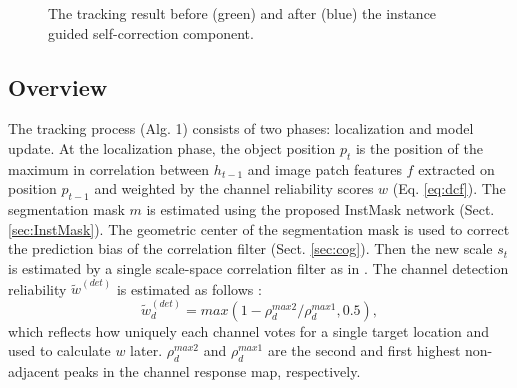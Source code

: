 \documentclass[review]{elsarticle}
\begin{document}
\begin{figure}
                       \hspace{-0.6em}
    \caption{The tracking result before (green) and after (blue) the instance guided self-correction component.}
    \label{fig:IGSC}
\end{figure}

\subsection{Overview}

The tracking process (Alg. 1) consists of two phases: localization and model update. 
At the localization phase,  the object position $p_t$ is the position of the maximum in correlation between $h_{t-1}$ and image patch features $f$ extracted on position $p_{t-1}$ and weighted by the channel reliability scores $w$ (Eq. \ref{eq:dcf}).
The segmentation mask $m$ is estimated using the proposed InstMask network (Sect. \ref{sec:InstMask}).
The geometric center of the segmentation mask is used to correct the prediction bias of the correlation filter (Sect. \ref{sec:cog}).
Then the new scale $s_t$ is estimated by a single scale-space correlation filter as in \cite{Danelljan2014AccurateSE}.
The channel detection reliability $\tilde{w}^{(det)}$ is estimated as follows \cite{Lukezic2017DiscriminativeCF}:
\begin{equation} \label{eq:det}
\tilde w_d^{(det)} = max(1 - \rho_d^{max2} / \rho_d^{max1}, 0.5),
\end{equation}
which reflects how uniquely each channel votes for a single target location and used to calculate $w$ later. $\rho_d^{max2}$ and $\rho_d^{max1}$ are the second and first highest non-adjacent peaks in the channel response map, respectively.
\end{document}
